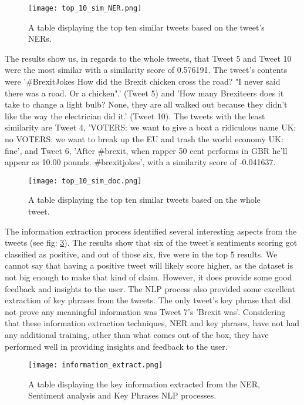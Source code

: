 	
	\begin{figure}[h]
		\centering
		\texttt{[image: top\_10\_sim\_NER.png]}
		\caption{A table displaying the top ten similar tweets based on the tweet's NERs.}
		\label{fig:top_10_sim_NER}
		
	\end{figure}

	The results show us, in regards to the whole tweets, that Tweet 5 and Tweet 10 were the most similar with a similarity score of 0.576191. The tweet's contents were '\#BrexitJokes How did the Brexit chicken cross the road? "I never said there was a road. Or a chicken".' (Tweet 5) and 'How many Brexiteers does it take to change a light bulb? None, they are all walked out because they didn't like the way the electrician did it.' (Tweet 10). The tweets with the least similarity are Tweet 4, 'VOTERS: we want to give a boat a ridiculous name UK: no VOTERS: we want to break up the EU and trash the world economy UK: fine', and Tweet 6, 'After \#brexit, when rapper 50 cent performs in GBR he'll appear as 10.00 pounds. \#brexitjokes', with a similarity score of -0.041637.

	\begin{figure}[h]
		\centering
		\texttt{[image: top\_10\_sim\_doc.png]}
		\caption{A table displaying the top ten similar tweets based on the whole tweet.}
		\label{fig:top_10_sim_doc}
		
	\end{figure}

	The information extraction process identified several interesting aspects from the tweets (see fig: \ref{fig:information_extract}). The results show that six of the tweet's sentiments scoring got classified as positive, and out of those six, five were in the top 5 results. We cannot say that having a positive tweet will likely score higher, as the dataset is not big enough to make that kind of claim. However, it does provide some good feedback and insights to the user. The NLP process also provided some excellent extraction of key phrases from the tweets. The only tweet's key phrase that did not prove any meaningful information was Tweet 7's 'Brexit was'. Considering that these information extraction techniques, NER and key phrases, have not had any additional training, other than what comes out of the box, they have performed well in providing insights and feedback to the user.


	\begin{figure}[h]
		\centering
		\texttt{[image: information\_extract.png]}
		\caption{A table displaying the key information extracted from the NER, Sentiment analysis and Key Phrases NLP processes.}
		\label{fig:information_extract}
		
	\end{figure}

